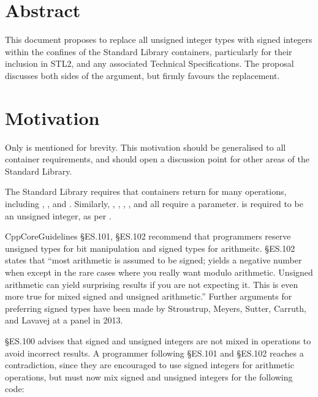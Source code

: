 
\maketitle

\section*{Abstract}
This document proposes to replace all unsigned integer types with signed integers within the
confines of the Standard Library containers, particularly for their inclusion in STL2, and any
associated Technical Specifications. The proposal discusses both sides of the argument, but firmly
favours the replacement.

\section*{Motivation}
Only  is mentioned for brevity. This motivation should be generalised to all container
requirements, and should open a discussion point for other areas of the Standard Library.

The Standard Library requires that containers return  for many operations,
including , , and . Similarly, ,
, , , and  all require a 
parameter.  is required to be an unsigned integer, as per
.

CppCoreGuidelines\cite{stroustrup15} \S ES.101, \S ES.102 recommend that programmers reserve
unsigned types for bit manipulation and signed types for arithmeitc. \S ES.102 states that ``most
arithmetic is assumed to be signed;  yields a negative number when  except in
the rare cases where you really want modulo arithmetic. Unsigned arithmetic can yield surprising
results if you are not expecting it. This is even more true for mixed signed and unsigned
arithmetic.'' Further arguments for preferring signed types have been made by Stroustrup, Meyers,
Sutter, Carruth, and Lavavej at a panel in 2013\cite{panel}.

\cite{stroustrup15}\S ES.100 advises that signed and unsigned integers are not mixed in operations
to avoid incorrect results. A programmer following \S ES.101 and
\S ES.102 reaches a contradiction, since they are encouraged to use signed integers for arithmetic
operations, but must now mix signed and unsigned integers for the following code:

